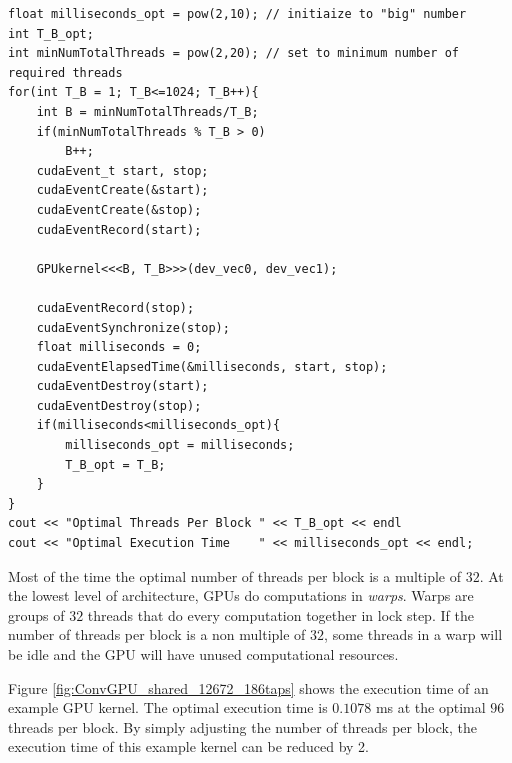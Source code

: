 \singlespacing
\clearpage
\begin{lstlisting}[style=myCUDAstyle,caption={Code snippet for thread optimization.},label={code:threadTiming}]
float milliseconds_opt = pow(2,10); // initiaize to "big" number
int T_B_opt;
int minNumTotalThreads = pow(2,20); // set to minimum number of required threads
for(int T_B = 1; T_B<=1024; T_B++){
	int B = minNumTotalThreads/T_B;
	if(minNumTotalThreads % T_B > 0)
		B++;
	cudaEvent_t start, stop;
	cudaEventCreate(&start);
	cudaEventCreate(&stop);
	cudaEventRecord(start);
	
	GPUkernel<<<B, T_B>>>(dev_vec0, dev_vec1);
	
	cudaEventRecord(stop);
	cudaEventSynchronize(stop);
	float milliseconds = 0;
	cudaEventElapsedTime(&milliseconds, start, stop);
	cudaEventDestroy(start);
	cudaEventDestroy(stop);
	if(milliseconds<milliseconds_opt){
		milliseconds_opt = milliseconds;
		T_B_opt = T_B;
	}
}
cout << "Optimal Threads Per Block " << T_B_opt << endl
cout << "Optimal Execution Time    " << milliseconds_opt << endl;
\end{lstlisting}
\doublespacing

Most of the time the optimal number of threads per block is a multiple of $32$. 
At the lowest level of architecture, GPUs do computations in \textit{warps}.
Warps are groups of $32$ threads that do every computation together in lock step.
If the number of threads per block is a non multiple of $32$, some threads in a warp will be idle and the GPU will have unused computational resources.

Figure \ref{fig:ConvGPU_shared_12672_186taps} shows the execution time of an example GPU kernel.
The optimal execution time is $0.1078$ ms at the optimal $96$ threads per block.
By simply adjusting the number of threads per block, the execution time of this example kernel can be reduced by 2.

